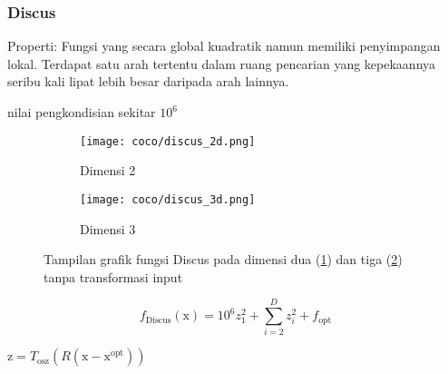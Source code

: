 \subsubsection*{Discus}
\noindent Properti:
Fungsi yang secara global kuadratik namun memiliki penyimpangan lokal. Terdapat satu arah tertentu dalam ruang pencarian yang kepekaannya seribu kali lipat lebih besar daripada arah lainnya.
\begin{packed_item}
  \item nilai pengkondisian sekitar $10^6$
\end{packed_item}
\begin{figure}[H]
	\centering
	\begin{subfigure}[b]{0.4\textwidth}
		\centering
		\texttt{[image: coco/discus\_2d.png]}
		\caption{Dimensi 2}
		\label{fig:discus_coco_2d}
	\end{subfigure}
	\hfill
	\begin{subfigure}[b]{0.4\textwidth}
		\centering
		\texttt{[image: coco/discus\_3d.png]}
		\caption{Dimensi 3}
		\label{fig:discus_coco_3d}
	\end{subfigure}
	\caption{Tampilan grafik fungsi Discus pada dimensi dua (\cref{fig:discus_coco_2d}) dan tiga (\cref{fig:discus_coco_3d}) tanpa transformasi input}
	\label{fig:discus_coco}
\end{figure}
\begin{equation}
  f_{\text{Discus}}(\mathrm{x})=10^6z_1^2+\sum_{i=2}^{D}z_i^2+f_{\text{opt}}
\end{equation}
\begin{packed_item}
    \item $\mathrm{z}=T_{\text{osz}}(R(\mathrm{x}-\mathrm{x}^{\text{opt}}))$
\end{packed_item}

